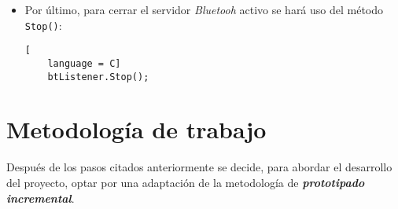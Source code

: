 \begin{itemize}
\begin{lstlisting}[
  language = C,
  caption = {Método que implementa un servicio de recepción de archivos de
  los clientes.},
  label = code:btListener]
  public void servicio()
  {
    string fichero, buffer;
    int count;
    do
    {
      try
      {
        //esperamos a un nuevo cliente Bluetooth
        BluetoothClient cliente = btListener.AcceptBluetoothClient();
        //obtenemos un stream del cliente para poder leer los datos que nos envie
        StreamReader streamR =
          new StreamReader(cliente.GetStream(), Encoding.UTF8);
        //leemos el nombre del fichero
        fichero = streamR.ReadLine();
        if (fichero != "")
        {
          //creamos un nuevo fichero con ese nombre
          FileStream streamW = new FileStream(fichero,
          FileMode.OpenOrCreate, FileAccess.Write);
          BinaryWriter bw = new BinaryWriter(streamW);
          do
          {
            //leemos una linea enviada por el cliente
            buffer = streamR.ReadLine();
            //la procesamos
            byte[] data = Convert.FromBase64String(buffer);
            count = data.Length;
            //la escribimos en el fichero
            if (count > 0)
              bw.Write(data, 0, count);
            //hasta que detecte el final del fichero
          } while (!streamR.EndOfStream);
          MessageBox.Show("Fichero recibido: " + fichero);
          //cerramos el fichero
          bw.Flush();
          bw.Close();
        }
        //cerramos todas la conexion con el cliente
        streamR.Close();
        cliente.Close();
      }
      catch (Exception ex)
      {
        if (!salir)
          MessageBox.Show("Error: " + ex.Message);
      }
    } while (!salir);
  }
\end{lstlisting}

El método \texttt{Close()}, de la clase \texttt{BluetoothClient}, finaliza
la conexión con el cliente.

\item Por último, para cerrar el servidor \emph{Bluetooh} activo
se hará uso del método \texttt{Stop()}:

  \begin{lstlisting}[
    language = C]
    btListener.Stop();
  \end{lstlisting}

\end{itemize}

\section{Metodología de trabajo}
\label{sec:workingMethodology}
Después de los pasos citados anteriormente se decide, para abordar el
desarrollo del proyecto, optar por una adaptación de la metodología de 
\emph{\textbf{prototipado incremental}}.

